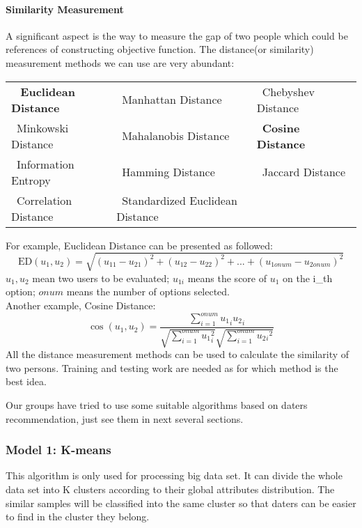 \paragraph{Similarity Measurement \label{sm}}
A significant aspect is the way to measure the gap of two people which could be references of constructing objective function. The distance(or similarity) measurement methods we can use are very abundant\cite{2}:\\
\begin{tabular}{p{0.3\linewidth}p{0.4\linewidth}p{0.3\linewidth}}
	\textbullet \ \textbf{ Euclidean Distance} & \textbullet \  Manhattan Distance  & \textbullet \ Chebyshev Distance \\
	\textbullet \ Minkowski Distance & \textbullet \   Mahalanobis Distance & \textbullet \  \textbf{Cosine Distance}\\
	\textbullet \ Information Entropy & \textbullet \ Hamming Distance & \textbullet \ Jaccard Distance \\
	\textbullet \ 	Correlation Distance & \textbullet \ Standardized Euclidean Distance
\end{tabular}
For example, Euclidean Distance can be presented as followed:
\begin{equation}
{\textrm{ED}}(u_1,u_2) = \sqrt {{{(u{_{11}} - u_{21})}^2} + {{(u_{12} - u_{22})}^2} + ... + {{(u{_{1onum}} - u{_{2onum}})}^2}}
\end{equation}
$u_1, u_2$ mean two users to be evaluated; $u_{1i}$ means the score of $u_1$ on the i\_th option; $onum$ means the number of options selected.\\
Another example, Cosine Distance:
\begin{equation}
\cos ({u_1},{u_2}) = \frac{{\sum\limits_{i = 1}^{onum} {{u_1}_i{u_2}_i} }}{{\sqrt {\sum\limits_{i = 1}^{onum} {{u_1}_i^2} } \sqrt {\sum\limits_{i = 1}^{onum} {{u_2}{{_i}^2}} } }}
\end{equation}
All the distance measurement methods can be used to calculate the similarity of two persons. Training and testing work are needed as for which method is the best idea. \par
Our groups have tried to use some suitable algorithms based on daters recommendation, just see them in next several sections.

\subsubsection{Model 1: K-means}

This algorithm is only used for processing big data set. It can divide the whole data set into K clusters according to their global attributes distribution. The similar samples will be classified into the same cluster so that daters can be easier to find in the cluster they belong. 

